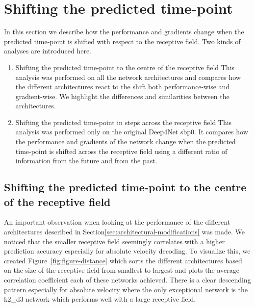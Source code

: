 \section{Shifting the predicted time-point}\label{sec:shifting-the-predicted-time-point}
In this section we describe how the performance and gradients change when the predicted time-point is shifted with respect to the receptive field.
Two kinds of analyses are introduced here.

\begin{enumerate}
    \item Shifting the predicted time-point to the centre of the receptive field
This analysis was performed on all the network architectures and compares how the different architectures react to the shift both performance-wise and gradient-wise.
We highlight the differences and similarities between the architectures.
    \item Shifting the predicted time-point in steps across the receptive field
This analysis was performed only on the original Deep4Net sbp0.
It compares how the performance and gradients of the network change when the predicted time-point is shifted across the receptive field using a different ratio of information from the future and from the past.
\end{enumerate}


\subsection{Shifting the predicted time-point to the centre of the receptive field}\label{subsec:shifting-the-predicted-time-point-to-the-centre-of-the-receptive-field}
An important observation when looking at the performance of the different architectures described in Section\ref{sec:architectural-modifications} was made.
We noticed that the smaller receptive field seemingly correlates with a higher prediction accuracy especially for absolute velocity decoding.
To visualize this, we created Figure~\ref{fig:figure-distance} which sorts the different architectures based on the size of the receptive field from smallest to largest and plots the average correlation coefficient each of these networks achieved.
There is a clear descending pattern especially for absolute velocity where the only exceptional network is the k2\_d3 network which performs well with a large receptive field.


